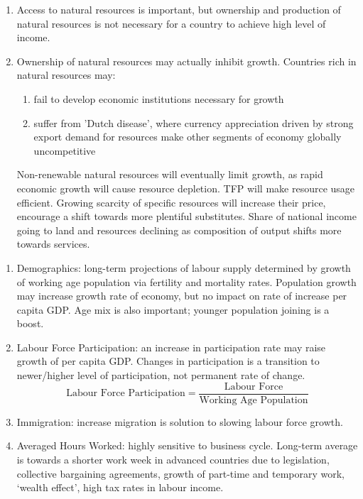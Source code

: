\begin{remark} 
\begin{enumerate}[label=\roman*.]
\setlength{\itemsep}{0pt}
\item Access to natural resources is important, but ownership and production of natural resources is not necessary for a country to achieve high level of income.
\item Ownership of natural resources may actually inhibit growth. Countries rich in natural resources may:
\begin{enumerate}[label=\arabic*.]
\setlength{\itemsep}{0pt}
\item fail to develop economic institutions necessary for growth
\item suffer from 'Dutch disease', where currency appreciation driven by strong export demand for resources make other segments of economy globally uncompetitive
\end{enumerate}
Non-renewable natural resources will eventually limit growth, as rapid economic growth will cause resource depletion. TFP will make resource usage efficient. Growing scarcity of specific resources will increase their price, encourage a shift towards more plentiful substitutes. Share of national income going to land and resources declining as composition of output shifts more towards services.
\end{enumerate}
\end{remark}

\begin{remark} 
\begin{enumerate}[label=\roman*.]
\setlength{\itemsep}{0pt}
\item Demographics: long-term projections of labour supply determined by growth of working age population via fertility and mortality rates. Population growth may increase growth rate of economy, but no impact on rate of increase per capita GDP. Age mix is also important; younger population joining is a boost.
\item Labour Force Participation: an increase in participation rate may raise growth of per capita GDP. Changes in participation is a transition to newer/higher level of participation, not permanent rate of change.
\begin{equation}
\text{Labour Force Participation} = \frac{\text{Labour Force}}{\text{Working Age Population}} \nonumber
\end{equation}
\item Immigration: increase migration is solution to slowing labour force growth.
\item Averaged Hours Worked: highly sensitive to business cycle. Long-term average is towards a shorter work week in advanced countries due to legislation, collective bargaining agreements, growth of part-time and temporary work, ‘wealth effect’, high tax rates in labour income.
\end{enumerate}
\end{remark}

